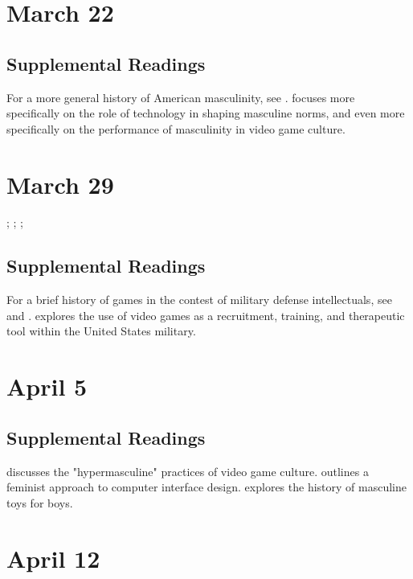 \documentclass[11pt]{article}
\begin{document}
\section{March 22}


\subsection{Supplemental Readings}

For a more general history of American masculinity, see \cite{Rotundo:1994ts}. \cite{Mellstrom:2004ur} focuses more specifically on the role of technology in shaping masculine norms, and \cite{Burrill2008} even more specifically on the performance of masculinity in video game culture.

\section{March 29}

; ; ; 


\subsection{Supplemental Readings}
For a brief history of games in the contest of military defense intellectuals, see \cite{GhamariTabrizi:2000wh} and \cite{JenniferLight:2008ck}. \cite{Mead:2013vv} explores the use of video games as a recruitment, training, and therapeutic tool within the United States military.

\section{April 5}


\subsection{Supplemental Readings}

\cite{Salter:2012fa} discusses the "hypermasculine" practices of video game culture.  \cite{Bardzell:2010dv} outlines a feminist approach to computer interface design. \cite{Varney:2002en} explores the history of masculine toys for boys.  

\section{April 12}
\end{document}
